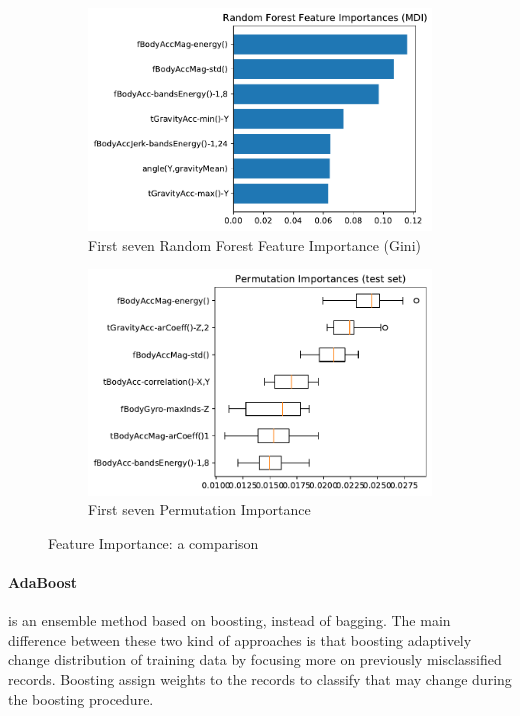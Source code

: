 \documentclass[10pt, a4paper, twocolumn]{article}
\begin{document}
\begin{figure}
    \centering
    \begin{subfigure}[t]{0.49\columnwidth}
    \includegraphics[width=\linewidth]{RF_importance.pdf}
    \caption{First seven Random Forest Feature Importance (Gini)}
    \label{fig:importance_rffi}
\end{subfigure}
  \hfill %
\begin{subfigure}[t]{0.49\columnwidth}
    \includegraphics[width=\linewidth]{random_importance.pdf}
    \caption{First seven Permutation Importance}
    \label{fig:permutation_importance}
    \end{subfigure}
    \caption{Feature Importance: a comparison}\label{fig:rf_importance}
\end{figure}

\paragraph{AdaBoost} is an ensemble method based on boosting, instead of bagging. The main difference between these two kind of approaches is that boosting adaptively change distribution of training data by focusing more on previously misclassified records. Boosting assign weights to the records to classify that may change during the boosting procedure.
\end{document}
